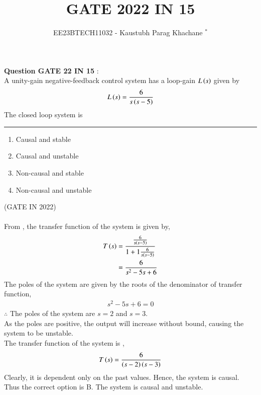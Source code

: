 \documentclass[journal,12pt,twocolumn]{IEEEtran}
\theoremstyle{remark}
\begin{document}

\vspace{3cm}

\Large\title{GATE 2022 IN 15}
\large\author{EE23BTECH11032 - Kaustubh Parag Khachane $^{*}$%
}
\maketitle
\newpage
\bigskip

\renewcommand{\thefigure}{\theenumi}
\renewcommand{\thetable}{\theenumi}
\large\textbf{Question GATE 22 IN 15} :\\
A unity-gain negative-feedback control system has a loop-gain $L\left(s\right)$ given by
\begin{align}
    L\left(s\right) = \frac{6}{s\left(s-5\right)}
\end{align}
The closed loop system is \rule{1cm}{0.15mm}
\begin{enumerate}
    \item Causal and stable
    \item Causal and unstable
    \item Non-causal and stable
    \item Non-causal and unstable
\end{enumerate}
\hfill(GATE IN 2022)\\
\solution\\

From , the transfer function of the system is given by,
\begin{align}
    T\left(s\right) &= \frac{\frac{6}{s\left(s-5\right)}}{1 + 1\frac{6}{s\left(s-5\right)}}\\
    &= \frac{6}{s^2 - 5s + 6}
\end{align}
The poles of the system are given by the roots of the denominator of transfer function,
\begin{align}
    s^2 - 5s + 6 = 0
\end{align}
$\therefore$ The poles of the system are $s = 2$ and $s = 3$.\\
As the poles are positive, the output will increase without bound, causing the system to be unstable.
\\The transfer function of the system is ,
\begin{align}
    T\left(s\right) = \frac{6}{\left(s-2\right)\left(s-3\right)}
\end{align}
Clearly, it is dependent only on the past values. Hence, the system is causal.
\\Thus the correct option is B. The system is causal and unstable.
\end{document}
